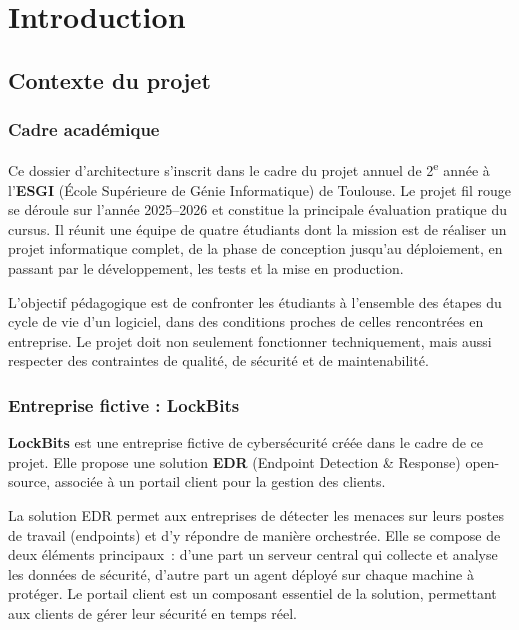 
\chapter{Introduction}

\section{Contexte du projet}

\subsection{Cadre académique}

Ce dossier d'architecture s'inscrit dans le cadre du projet annuel de
2\textsuperscript{e} année à l'\textbf{ESGI} (École Supérieure de Génie
Informatique) de Toulouse. Le projet fil rouge se déroule sur l'année
2025--2026 et constitue la principale évaluation pratique du cursus. Il
réunit une équipe de quatre étudiants dont la mission est de réaliser un
projet informatique complet, de la phase de conception jusqu'au
déploiement, en passant par le développement, les tests et la mise en
production.

L'objectif pédagogique est de confronter les étudiants à l'ensemble des
étapes du cycle de vie d'un logiciel, dans des conditions proches de
celles rencontrées en entreprise. Le projet doit non seulement
fonctionner techniquement, mais aussi respecter des contraintes de
qualité, de sécurité et de maintenabilité.

\subsection{Entreprise fictive : LockBits}

\textbf{LockBits} est une entreprise fictive de cybersécurité créée dans
le cadre de ce projet. Elle propose une solution \textbf{EDR} (Endpoint
Detection \& Response) open-source, associée à un portail client pour la
gestion des clients.

La solution EDR permet aux entreprises de détecter les menaces sur leurs
postes de travail (endpoints) et d'y répondre de manière orchestrée.
Elle se compose de deux éléments principaux~: d'une part un serveur
central qui collecte et analyse les données de sécurité, d'autre part un
agent déployé sur chaque machine à protéger. Le portail client est un composant essentiel de la solution, permettant
aux clients de gérer leur sécurité en temps réel.


